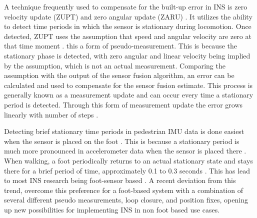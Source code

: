 A technique frequently used to compensate for the built-up error in INS is zero velocity update (ZUPT) and zero angular update (ZARU) \cite{Harle2013}. It utilizes the ability to detect time periods in which the sensor is stationary during locomotion. Once detected, ZUPT uses the assumption that speed and angular velocity are zero at that time moment \cite{Wu2019,Harle2013}. this a form of pseudo-measurement. This is because the stationary phase is detected, with zero angular and linear velocity being implied by the assumption, which is not an actual measurement. Comparing the assumption with the output of the sensor fusion algorithm, an error can be calculated and used to compensate for the sensor fusion estimate. This process is generally known as a measurement update and can occur every time a stationary period is detected.  Through this form of measurement update the error grows linearly with number of steps \cite{foxlin2005pedestrian}.\par

Detecting brief stationary time periods in pedestrian IMU data is done easiest when the sensor is placed on the foot \cite{Diez2018,Davidson2017}. This is because a stationary period is much more pronounced in accelerometer data when the sensor is placed there \cite{Yu2019,Wu2019}.  When walking, a foot periodically returns to an actual stationary state and stays there for a brief period of time, approximately 0.1 to 0.3 seconds \cite{Ren2016a}. This has lead to most \ac{INS} research being foot-sensor based \cite{Diez2018,Wu2019}. A recent deviation from this trend, \citet{Solin2018a} overcome this preference for a foot-based system with a combination of several different pseudo measurements, loop closure, and position fixes, opening up new possibilities for implementing INS in non foot based use cases.\\

